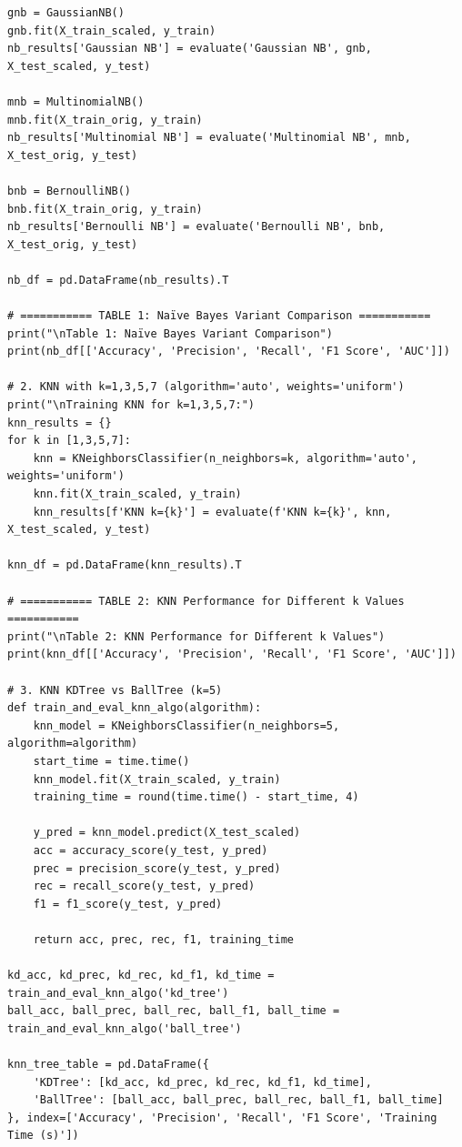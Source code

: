 \documentclass[12pt]{article}
\begin{document}
\begin{verbatim}
gnb = GaussianNB()
gnb.fit(X_train_scaled, y_train)
nb_results['Gaussian NB'] = evaluate('Gaussian NB', gnb, X_test_scaled, y_test)

mnb = MultinomialNB()
mnb.fit(X_train_orig, y_train)
nb_results['Multinomial NB'] = evaluate('Multinomial NB', mnb, X_test_orig, y_test)

bnb = BernoulliNB()
bnb.fit(X_train_orig, y_train)
nb_results['Bernoulli NB'] = evaluate('Bernoulli NB', bnb, X_test_orig, y_test)

nb_df = pd.DataFrame(nb_results).T

# =========== TABLE 1: Naïve Bayes Variant Comparison ===========
print("\nTable 1: Naïve Bayes Variant Comparison")
print(nb_df[['Accuracy', 'Precision', 'Recall', 'F1 Score', 'AUC']])

# 2. KNN with k=1,3,5,7 (algorithm='auto', weights='uniform')
print("\nTraining KNN for k=1,3,5,7:")
knn_results = {}
for k in [1,3,5,7]:
    knn = KNeighborsClassifier(n_neighbors=k, algorithm='auto', weights='uniform')
    knn.fit(X_train_scaled, y_train)
    knn_results[f'KNN k={k}'] = evaluate(f'KNN k={k}', knn, X_test_scaled, y_test)

knn_df = pd.DataFrame(knn_results).T

# =========== TABLE 2: KNN Performance for Different k Values ===========
print("\nTable 2: KNN Performance for Different k Values")
print(knn_df[['Accuracy', 'Precision', 'Recall', 'F1 Score', 'AUC']])

# 3. KNN KDTree vs BallTree (k=5)
def train_and_eval_knn_algo(algorithm):
    knn_model = KNeighborsClassifier(n_neighbors=5, algorithm=algorithm)
    start_time = time.time()
    knn_model.fit(X_train_scaled, y_train)
    training_time = round(time.time() - start_time, 4)

    y_pred = knn_model.predict(X_test_scaled)
    acc = accuracy_score(y_test, y_pred)
    prec = precision_score(y_test, y_pred)
    rec = recall_score(y_test, y_pred)
    f1 = f1_score(y_test, y_pred)

    return acc, prec, rec, f1, training_time

kd_acc, kd_prec, kd_rec, kd_f1, kd_time = train_and_eval_knn_algo('kd_tree')
ball_acc, ball_prec, ball_rec, ball_f1, ball_time = train_and_eval_knn_algo('ball_tree')

knn_tree_table = pd.DataFrame({
    'KDTree': [kd_acc, kd_prec, kd_rec, kd_f1, kd_time],
    'BallTree': [ball_acc, ball_prec, ball_rec, ball_f1, ball_time]
}, index=['Accuracy', 'Precision', 'Recall', 'F1 Score', 'Training Time (s)'])


\end{verbatim}
\end{document}
